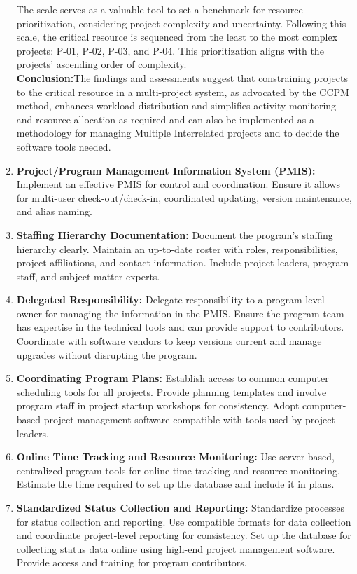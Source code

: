 \documentclass{llncs}
\begin{document}
\begin{enumerate}
\begin{figure}
                    \end{figure}
    The scale serves as a valuable tool to set a benchmark for resource prioritization, considering project complexity and uncertainty. Following this scale, the critical resource is sequenced from the least to the most complex projects: P-01, P-02, P-03, and P-04. This prioritization aligns with the projects' ascending order of complexity.~\cite{refpaper7} \\
    \textbf{Conclusion:}The findings and assessments suggest that constraining projects to the critical resource in a multi-project system, as advocated by the CCPM method, enhances workload distribution and simplifies activity monitoring and resource allocation as required and can also be implemented as a methodology for managing Multiple Interrelated projects and to decide the software tools needed.~\cite{refpaper7}
    \item\textbf{Project/Program Management Information System (PMIS):}
    Implement an effective PMIS for control and coordination.
    Ensure it allows for multi-user check-out/check-in, coordinated updating, version maintenance, and alias naming.
    \item\textbf{Staffing Hierarchy Documentation:}
    Document the program’s staffing hierarchy clearly.
    Maintain an up-to-date roster with roles, responsibilities, project affiliations, and contact information.
    Include project leaders, program staff, and subject matter experts.
    \item \textbf{Delegated Responsibility:}
    Delegate responsibility to a program-level owner for managing the information in the PMIS. Ensure the program team has expertise in the technical tools and can provide support to contributors.
    Coordinate with software vendors to keep versions current and manage upgrades without disrupting the program.
    \item \textbf{Coordinating Program Plans:}
    Establish access to common computer scheduling tools for all projects.
    Provide planning templates and involve program staff in project startup workshops for consistency. Adopt computer-based project management software compatible with tools used by project leaders.
    \item \textbf{Online Time Tracking and Resource Monitoring:}
    Use server-based, centralized program tools for online time tracking and resource monitoring.
    Estimate the time required to set up the database and include it in plans.
    \item \textbf{Standardized Status Collection and Reporting:}
    Standardize processes for status collection and reporting.
    Use compatible formats for data collection and coordinate project-level reporting for consistency.
    Set up the database for collecting status data online using high-end project management software.
    Provide access and training for program contributors.
\end{enumerate}
\end{document}
